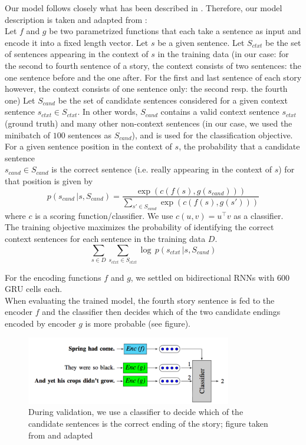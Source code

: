 \documentclass{article}
\begin{document}
Our model follows closely what has been described in \cite{eff_framework}. Therefore, our model description is taken and adapted from \cite{eff_framework}: \\[.1cm]
Let $f$ and $g$ be two parametrized functions that each take a sentence as input and encode it into a fixed length vector. Let $s$ be a given sentence. Let $S_{ctxt}$ be the set of sentences appearing in the context of $s$ in the training data (in our case: for the second to fourth sentence of a story, the context consists of two sentences: the one sentence before and the one after. For the first and last sentence of each story however, the context consists of one sentence only: the second resp. the fourth one) Let $S_{cand}$ be the set of candidate sentences considered for a given context sentence $s_{ctxt} \in S_{ctxt}$. In other words, $S_{cand}$ contains a valid context sentence $s_{ctxt}$ (ground truth) and many other non-context sentences (in our case, we used the minibatch of $100$ sentences as $S_{cand}$), and is used for the classification objective. \\[.2cm]
For a given sentence position in the context of $s$, the probability that a candidate sentence \\$s_{cand}\in S_{cand}$ is the correct sentence (i.e. really appearing in the context of $s$) for that position is given by
$$
p(s_{cand} \, | s, S_{cand}) = \frac{\exp(c(f(s), g(s_{cand})))}{\sum_{s'\in S_{cand}}\exp(c(f(s), g(s')))}
$$
where $c$ is  a scoring function/classifier. We use $c(u, v) = u^\top v$ as  a classifier. \\[.3cm]
The training objective maximizes the probability of identifying the correct context sentences for each sentence in the training data $D$.
$$
\sum_{s\in D} \sum_{s_{ctxt} \in S_{ctxt}} \log \, p(s_{ctxt} \, | s, S_{cand})
$$

For the encoding functions $f$ and $g$, we settled on bidirectional RNNs with 600 GRU cells each. \\[.1cm]
When evaluating the trained model, the fourth story sentence is fed to the encoder $f$ and the classifier then decides which of the two candidate endings encoded by encoder $g$ is more probable (see figure).
\begin{figure}[h]
\includegraphics[width=0.8\textwidth]{fig_architecture_test}


\caption{During validation, we use a classifier to decide which of the candidate sentences is the correct ending of the story; figure taken from \cite{eff_framework} and adapted}
\end{figure}
\end{document}
